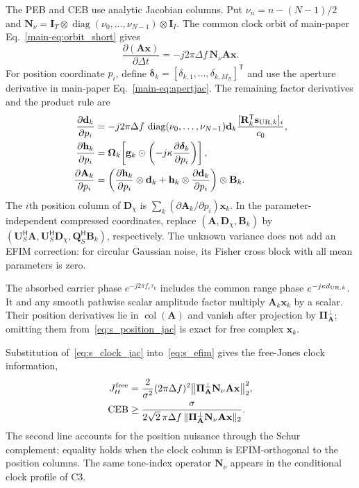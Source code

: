 \documentclass[journal,letterpaper]{IEEEtran}
\newcommand{\bx}{\mathbf{x}}
\newcommand{\bd}{\mathbf{d}}
\newcommand{\bg}{\mathbf{g}}
\newcommand{\bh}{\mathbf{h}}
\newcommand{\bs}{\mathbf{s}}
\newcommand{\bA}{\mathbf{A}}
\newcommand{\bBm}{\mathbf{B}}
\newcommand{\bD}{\mathbf{D}}
\newcommand{\bI}{\mathbf{I}}
\newcommand{\bN}{\mathbf{N}}
\newcommand{\bPi}{\boldsymbol{\Pi}}
\newcommand{\bQ}{\mathbf{Q}}
\newcommand{\bR}{\mathbf{R}}
\newcommand{\bU}{\mathbf{U}}
\newcommand{\bOmega}{\boldsymbol{\Omega}}
\newcommand{\coll}{\operatorname{col}}
\newcommand{\diag}{\operatorname{diag}}
\begin{document}
The PEB and CEB use analytic Jacobian columns.  Put $\nu_n=n-(N-1)/2$ and
$\bN_\nu=\bI_T\otimes\diag(\nu_0,\ldots,\nu_{N-1})\otimes\bI_I$.  The common
clock orbit of main-paper Eq.~\eqref{main-eq:orbit_short} gives
\begin{equation}
 \frac{\partial(\bA\bx)}{\partial\Delta t}
 =-j2\pi\Delta f\,\bN_\nu\bA\bx .
 \label{eq:s_clock_jac}
\end{equation}
For position coordinate $p_i$, define
$\boldsymbol\delta_k=[\delta_{k,1},\ldots,\delta_{k,M_R}]^{\mathsf T}$ and
use the aperture derivative in main-paper Eq.~\eqref{main-eq:apertjac}.  The
remaining factor derivatives and the product rule are
\begin{align}
 \frac{\partial\bd_k}{\partial p_i}
 &=-j2\pi\Delta f\,\diag(\nu_0,\ldots,\nu_{N-1})\bd_k
 \frac{[\bR_k^{\mathsf T}\bs_{{\rm UR},k}]_i}{c_0},\nonumber\\
 \frac{\partial\bh_k}{\partial p_i}
 &=\bOmega_k\!\left[\bg_k\odot
 \left(-j\kappa\frac{\partial\boldsymbol\delta_k}{\partial p_i}\right)
 \right],\nonumber\\
 \frac{\partial\bA_k}{\partial p_i}
 &=\left(\frac{\partial\bh_k}{\partial p_i}\otimes\bd_k
 +\bh_k\otimes\frac{\partial\bd_k}{\partial p_i}\right)\otimes\bBm_k .
 \label{eq:s_position_jac}
\end{align}
The $i$th position column of $\bD_\chi$ is
$\sum_k(\partial\bA_k/\partial p_i)\bx_k$.  In the parameter-independent
compressed coordinates, replace
$(\bA,\bD_\chi,\bBm_k)$ by
$(\bU_S^{\mathsf H}\bA,\bU_S^{\mathsf H}\bD_\chi,
\bQ_S^{\mathsf H}\bBm_k)$, respectively.  The unknown variance does not add
an EFIM correction: for circular Gaussian noise, its Fisher cross block with
all mean parameters is zero.

The absorbed carrier phase $e^{-j2\pi f_c\tau_k}$ includes the common
range phase $e^{-j\kappa d_{{\rm UR},k}}$.  It and any smooth pathwise
scalar amplitude factor multiply $\bA_k\bx_k$ by a scalar.  Their
position derivatives lie in $\coll(\bA)$ and vanish after projection by
$\bPi_{\bA}^{\perp}$; omitting them from~\eqref{eq:s_position_jac} is
exact for free complex $\bx_k$.

Substitution of~\eqref{eq:s_clock_jac} into~\eqref{eq:s_efim} gives the
free-Jones clock information,
\begin{align}
 J_{tt}^{\rm free}
 &=\frac{2}{\sigma^2}(2\pi\Delta f)^2
 \big\|\bPi_{\bA}^{\perp}\bN_\nu\bA\bx\big\|_2^2,\nonumber\\
 {\rm CEB}
 &\ge \frac{\sigma}{2\sqrt{2}\,\pi\Delta f\,
 \|\bPi_{\bA}^{\perp}\bN_\nu\bA\bx\|_2}.
 \label{eq:s_clock_info}
\end{align}
The second line accounts for the position nuisance through the Schur
complement; equality holds when the clock column is EFIM-orthogonal to the
position columns.  The same tone-index operator $\bN_\nu$ appears in the
conditional clock profile of C3.
\end{document}
